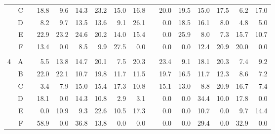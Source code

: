 \documentclass[12pt]{article}
\begin{document}
\begin{sidewaysfigure}
\begin{center}
\begin{tabular}{rr|rrrrrrrrrrrrrr}
  & C & & 18.8  & 9.6   & 14.3  & 23.2  & 15.0  & 16.8  && 20.0  & 19.5  & 15.0  & 17.5  & 6.2   & 17.0  \\
  & D & & 8.2   & 9.7   & 13.5  & 13.6  & 9.1   & 26.1  && 0.0   & 18.5  & 16.1  & 8.0   & 4.8   & 5.0   \\
  & E & & 22.9  & 23.2  & 24.6  & 20.2  & 14.0  & 15.4  && 0.0   & 25.9  & 8.0   & 7.3   & 15.7  & 10.7  \\
  & F & & 13.4  & 0.0   & 8.5   & 9.9   & 27.5  & 0.0   && 0.0   & 0.0   & 12.4  & 20.9  & 20.0  & 0.0   \\ & \\
4 & A & & 5.5   & 13.8  & 14.7  & 20.1  & 7.5   & 20.3  && 23.4  & 9.1   & 18.1  & 20.3  & 7.4   & 9.2   \\
  & B & & 22.0  & 22.1  & 10.7  & 19.8  & 11.7  & 11.5  && 19.7  & 16.5  & 11.7  & 12.3  & 8.6   & 7.2   \\
  & C & & 3.4   & 7.9   & 15.0  & 15.4  & 17.3  & 10.8  && 15.1  & 13.0  & 8.8   & 20.9  & 16.7  & 7.4   \\
  & D & & 18.1  & 0.0   & 14.3  & 10.8  & 2.9   & 3.1   && 0.0   & 0.0   & 34.4  & 10.0  & 17.8  & 0.0   \\
  & E & & 0.0   & 10.9  & 9.3   & 22.6  & 10.5  & 17.3  && 0.0   & 0.0   & 10.7  & 0.0   & 9.7   & 14.4  \\
  & F & & 58.9  & 0.0   & 36.8  & 13.8  & 0.0   & 0.0   && 0.0   & 0.0   & 29.4  & 0.0   & 32.9  & 0.0   \\
\hline
\end{tabular}
\end{center}
\end{sidewaysfigure}
\end{document}
